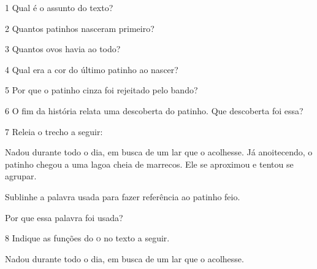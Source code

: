 \begin{conteudo}
\begin{conteudo}
\begin{conteudo}
\begin{conteudo}
\begin{conteudo}
\num{1} Qual é o assunto do texto?


\num{2} Quantos patinhos nasceram primeiro?


\num{3} Quantos ovos havia ao todo?


\num{4} Qual era a cor do último patinho ao nascer?


\num{5} Por que o patinho cinza foi rejeitado pelo bando?


\num{6} O fim da história relata uma descoberta do patinho. Que descoberta
foi essa?


\num{7} Releia o trecho a seguir:

\begin{myquote}
Nadou durante todo o dia, em busca de um lar que o acolhesse. Já
anoitecendo, o patinho chegou a uma lagoa cheia de marrecos. Ele
se aproximou e tentou se agrupar.
\end{myquote}

\begin{escolha}
\item Sublinhe a palavra usada para fazer referência ao patinho feio.

\item Por que essa palavra foi usada?
\end{escolha}

\num{8} Indique as funções do \textsc{o} no texto a seguir.

\begin{myquote}
Nadou durante todo o dia, em busca de um lar que o acolhesse.
\end{myquote}


\end{conteudo}
\end{conteudo}
\end{conteudo}
\end{conteudo}
\end{conteudo}
